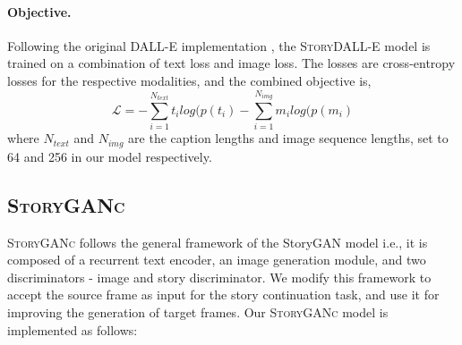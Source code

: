\documentclass[runningheads]{llncs}
\newcommand{\sdalle}[1]{\textsc{StoryDALL-E}}
\newcommand{\sgan}[1]{\textsc{StoryGANc}}
\begin{document}
\paragraph{Objective.} Following the original DALL-E implementation \cite{ramesh2021zero}, the \sdalle{} model is trained on a combination of text loss and image loss. The losses are cross-entropy losses for the respective modalities, and the combined objective is,
\begin{equation*}
    \mathcal{L} = -\sum_{i=1}^{N_{text}}t_{i}log(p(t_{i}) -\sum_{i=1}^{N_{img}}m_{i}log(p(m_{i}) 
\end{equation*}
where $N_{text}$ and $N_{img}$ are the caption lengths and image sequence lengths, set to 64 and 256 in our model respectively.


\subsection{\sgan{}}
\sgan{} follows the general framework of the StoryGAN model \cite{li2019storygan} i.e., it is composed of a recurrent text encoder, an image generation module, and two discriminators - image and story discriminator. We modify this framework to accept the source frame as input for the story continuation task, and use it for improving the generation of target frames. Our \sgan{} model is implemented as follows:
\end{document}
